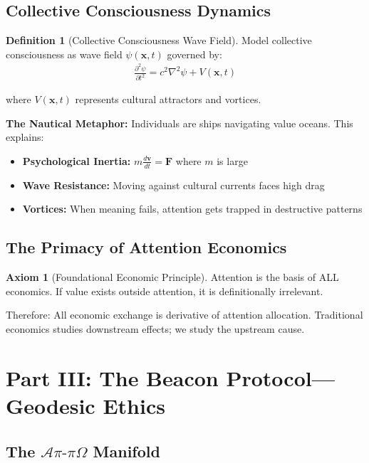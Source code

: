 \documentclass[11pt,a4paper]{article}
\theoremstyle{definition}
\newtheorem{definition}{Definition}[section]
\newtheorem{axiom}{Axiom}[section]
\theoremstyle{remark}
\begin{document}
\subsection{Collective Consciousness Dynamics}

\begin{definition}[Collective Consciousness Wave Field]
Model collective consciousness as wave field $\psi(\mathbf{x}, t)$ governed by:
\begin{align}
\frac{\partial^2 \psi}{\partial t^2} = c^2 \nabla^2 \psi + V(\mathbf{x}, t)
\end{align}

where $V(\mathbf{x}, t)$ represents cultural attractors and vortices.
\end{definition}

\textbf{The Nautical Metaphor:} Individuals are ships navigating value oceans. This explains:
\begin{itemize}
\item \textbf{Psychological Inertia:} $m\frac{d\mathbf{v}}{dt} = \mathbf{F}$ where $m$ is large
\item \textbf{Wave Resistance:} Moving against cultural currents faces high drag
\item \textbf{Vortices:} When meaning fails, attention gets trapped in destructive patterns
\end{itemize}

\subsection{The Primacy of Attention Economics}

\begin{axiom}[Foundational Economic Principle]
Attention is the basis of ALL economics. If value exists outside attention, it is definitionally irrelevant.
\end{axiom}

Therefore: All economic exchange is derivative of attention allocation. Traditional economics studies downstream effects; we study the upstream cause.

\section{Part III: The Beacon Protocol—Geodesic Ethics}

\subsection{The $\mathcal{A}\pi\text{-}\pi\Omega$ Manifold}
\end{document}
